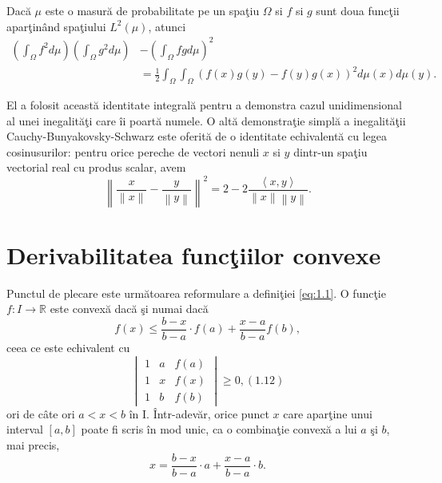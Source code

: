 \documentclass[a4paper,12pt,oneside]{report}
\begin{document}
Dac\u{a} \(\mu\) este o masur\u{a} de probabilitate pe un spa\c{t}iu \(\Omega\) si \(f\) si \(g\) sunt doua func\c{t}ii apar\c{t}in\^{a}nd spa\c{t}iului \(L^{2}\left ( \mu  \right )\), atunci
\begin{displaymath}
\begin{split}
  \left (\int_{\Omega}f^{2}d\mu \right )\left (\int_{\Omega}g^{2}d\mu \right ) &- \left (\int_{\Omega}fgd\mu \right )^{2}\\
   &= \frac{1}{2}\int_{\Omega}\int_{\Omega}\left ( f\left ( x \right )g\left ( y \right ) - f\left ( y \right )g\left ( x \right )\right )^{2}d\mu \left ( x \right )d\mu \left ( y \right ).
  \end{split}
\end{displaymath}
	
	El a folosit aceast\u{a} identitate integral\u{a} pentru a demonstra cazul unidimensional al unei inegalit\u{a}\c{t}i care \^{i}i poart\u{a} numele. O alt\u{a} demonstra\c{t}ie simpl\u{a} a inegalit\u{a}\c{t}ii Cauchy-Bunyakovsky-Schwarz este oferit\u{a}  de o identitate echivalent\u{a} cu legea cosinusurilor: pentru orice pereche de vectori nenuli \(x\) si \(y\) dintr-un spa\c{t}iu vectorial real cu produs scalar, avem
\begin{displaymath}
  \left \| \frac{x}{\left \| x \right \|} - \frac{y}{\left \| y \right \|}\right \|^{2} = 2 - 2\frac{\left \langle x , y \right \rangle}{\left \| x \right \|\left \| y \right \|}.
\end{displaymath}

\section{Derivabilitatea func\c{t}iilor convexe}

Punctul de plecare este urm\u{a}toarea reformulare a defini\c{t}iei \ref{eq:1.1}. O func\c{t}ie \(f : I \rightarrow \mathbb{R}\) este convex\u{a} dac\u{a} \c{s}i numai dac\u{a} 
\begin{displaymath}
   f\left ( x \right ) \leq \frac{b - x}{b - a} \cdot f\left ( a \right ) + \frac{x- a}{b - a}f\left ( b \right ), \label{eq:1.11} \tag{1.11}
\end{displaymath}
ceea ce este echivalent cu 
\begin{displaymath}
   \begin{vmatrix}
1 &  a& f\left ( a \right )\\ 
 1&  x& f\left ( x \right )\\ 
 1&  b& f\left ( b \right )
\end{vmatrix} \geq 0, (1.12)
\label{eq:1.12} \tag{1.12}
\end{displaymath}
ori de c\^{a}te ori \(a< x< b\) \^{i}n I. \^{I}ntr-adev\u{a}r,  orice punct \(x\) care apar\c{t}ine unui interval \(\left [ a,b \right ]\) poate fi scris \^{i}n mod unic, ca o combina\c{t}ie convex\u{a} a lui \(a\) \c{s}i \(b\), mai precis,
\begin{displaymath}
    x = \frac{b - x}{b - a} \cdot a  + \frac{x- a}{b - a}\cdot b.
\end{displaymath}
\end{document}
